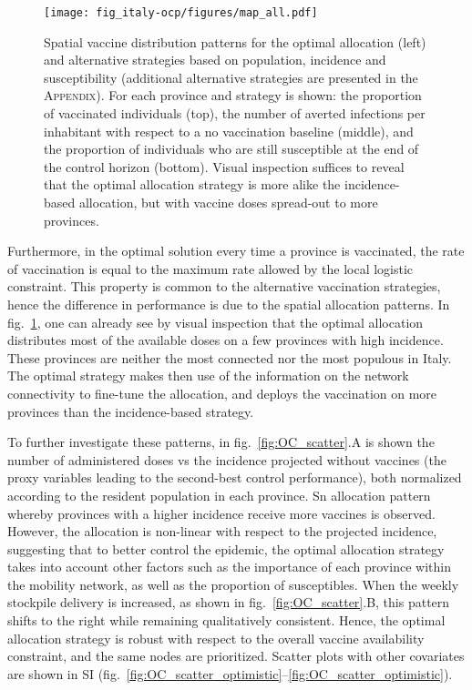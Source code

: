 \begin{figure}[!ht]
    \centering
    \texttt{[image: fig\_italy-ocp/figures/map\_all.pdf]}
    \caption[Spatial vaccine distribution patterns]{Spatial vaccine distribution patterns for the optimal allocation (left) and alternative strategies based on population, incidence and susceptibility (additional alternative strategies are presented in the \textsc{Appendix}). For each province and strategy is shown: the proportion of vaccinated individuals (top), the number of averted infections per inhabitant with respect to a no vaccination baseline (middle), and the proportion of individuals who are still susceptible at the end of the control horizon (bottom). Visual inspection suffices to reveal that the optimal allocation strategy is more alike the incidence-based allocation, but with vaccine doses spread-out to more provinces.}
    \label{fig:OC_multimap}
\end{figure}

Furthermore, in the optimal solution every time a province is vaccinated, the rate of vaccination is equal to the maximum rate allowed by the local logistic constraint. This property is common to the alternative vaccination strategies, hence the difference in performance is due to the spatial allocation patterns.%
In fig.~\ref{fig:OC_multimap}, one can already see by visual inspection that the optimal allocation distributes most of the available doses on a few provinces with high incidence. These provinces are neither the most connected nor the most populous in Italy. The optimal strategy makes then use of the information on the network connectivity to fine-tune the allocation, and deploys the vaccination on more provinces than the incidence-based strategy. %

To further investigate these patterns, in fig.~\ref{fig:OC_scatter}.A is shown the number of administered doses vs the incidence projected without vaccines (the proxy variables leading to the second-best control performance), both normalized according to the resident population in each province. Sn allocation pattern whereby provinces with a higher incidence receive more vaccines is observed. However, the allocation is non-linear with respect to the projected incidence, suggesting that to better control the epidemic, the optimal allocation strategy takes into account other factors such as the importance of each province within the mobility network, as well as the proportion of susceptibles. When the weekly stockpile delivery is increased, as shown in fig.~\ref{fig:OC_scatter}.B, this pattern shifts to the right while remaining qualitatively consistent. Hence, the optimal allocation strategy is robust with respect to the overall vaccine availability constraint, and the same nodes are prioritized. Scatter plots with other covariates are shown in SI (fig.~\ref{fig:OC_scatter_optimistic}--\ref{fig:OC_scatter_optimistic}). 

